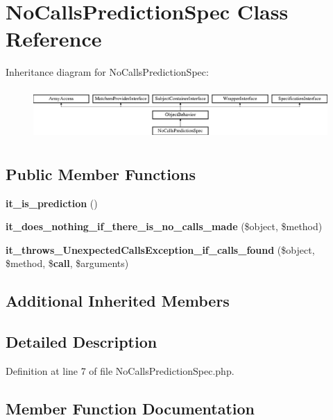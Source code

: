 \section{No\+Calls\+Prediction\+Spec Class Reference}
\label{classspec_1_1_prophecy_1_1_prediction_1_1_no_calls_prediction_spec}
Inheritance diagram for No\+Calls\+Prediction\+Spec\+:\begin{figure}[H]
\begin{center}
\leavevmode
\includegraphics[height=1.953488cm]{classspec_1_1_prophecy_1_1_prediction_1_1_no_calls_prediction_spec}
\end{center}
\end{figure}
\subsection*{Public Member Functions}
\begin{DoxyCompactItemize}
\item 
{\bf it\+\_\+is\+\_\+prediction} ()
\item 
{\bf it\+\_\+does\+\_\+nothing\+\_\+if\+\_\+there\+\_\+is\+\_\+no\+\_\+calls\+\_\+made} (\$object, \$method)
\item 
{\bf it\+\_\+throws\+\_\+\+Unexpected\+Calls\+Exception\+\_\+if\+\_\+calls\+\_\+found} (\$object, \$method, \${\bf call}, \$arguments)
\end{DoxyCompactItemize}
\subsection*{Additional Inherited Members}


\subsection{Detailed Description}


Definition at line 7 of file No\+Calls\+Prediction\+Spec.\+php.



\subsection{Member Function Documentation}
